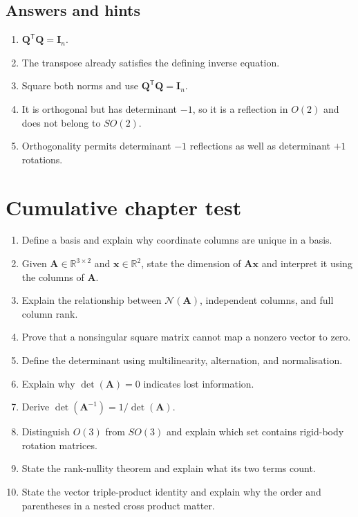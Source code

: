 \documentclass[
  australian,
  12pt,
  letterpaper,
  DIV=11,
  numbers=noendperiod,
  twoside]{scrreprt}
\providecommand{\tightlist}{%
  \setlength{\itemsep}{0pt}\setlength{\parskip}{0pt}}
\begin{document}
\subsection*{Answers and hints}\label{answers-and-hints-3}

\begin{enumerate}
\def\labelenumi{\arabic{enumi}.}
\tightlist
\item
  \(\mathbf Q^{\mathsf T}\mathbf Q=\mathbf I_n\).
\item
  The transpose already satisfies the defining inverse equation.
\item
  Square both norms and use
  \(\mathbf Q^{\mathsf T}\mathbf Q=\mathbf I_n\).
\item
  It is orthogonal but has determinant \(-1\), so it is a reflection in
  \(O(2)\) and does not belong to \(SO(2)\).
\item
  Orthogonality permits determinant \(-1\) reflections as well as
  determinant \(+1\) rotations.
\end{enumerate}

\section*{Cumulative chapter test}\label{cumulative-chapter-test}


\begin{enumerate}
\def\labelenumi{\arabic{enumi}.}
\tightlist
\item
  Define a basis and explain why coordinate columns are unique in a
  basis.
\item
  Given \(\mathbf A\in\mathbb R^{3\times2}\) and
  \(\mathbf x\in\mathbb R^2\), state the dimension of
  \(\mathbf A\mathbf x\) and interpret it using the columns of
  \(\mathbf A\).
\item
  Explain the relationship between \(\mathcal N(\mathbf A)\),
  independent columns, and full column rank.
\item
  Prove that a nonsingular square matrix cannot map a nonzero vector to
  zero.
\item
  Define the determinant using multilinearity, alternation, and
  normalisation.
\item
  Explain why \(\det(\mathbf A)=0\) indicates lost information.
\item
  Derive \(\det(\mathbf A^{-1})=1/\det(\mathbf A)\).
\item
  Distinguish \(O(3)\) from \(SO(3)\) and explain which set contains
  rigid-body rotation matrices.
\item
  State the rank-nullity theorem and explain what its two terms count.
\item
  State the vector triple-product identity and explain why the order and
  parentheses in a nested cross product matter.
\end{enumerate}
\end{document}
